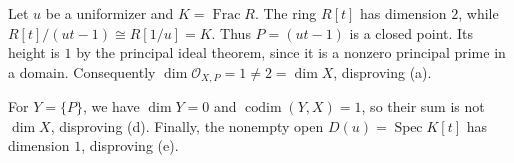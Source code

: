 Let $u$ be a uniformizer and $K=\operatorname{Frac}R$. The ring $R[t]$ has dimension $2$, while $R[t]/(ut-1)\cong R[1/u]=K$. Thus $P=(ut-1)$ is a closed point. Its height is $1$ by the principal ideal theorem, since it is a nonzero principal prime in a domain. Consequently $\dim\mathcal O_{X,P}=1\ne2=\dim X$, disproving (a).

For $Y=\{P\}$, we have $\dim Y=0$ and $\operatorname{codim}(Y,X)=1$, so their sum is not $\dim X$, disproving (d). Finally, the nonempty open $D(u)=\operatorname{Spec}K[t]$ has dimension $1$, disproving (e).
